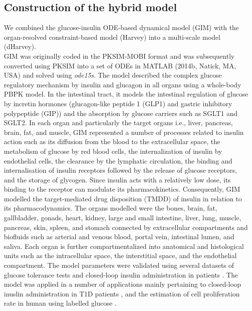 \subsection{Construction of the hybrid model} \label{GIM:sp1}
We combined the glucose-insulin ODE-based dynamical model (GIM) \cite{schaller2013generic} with the organ-resolved constraint-based model (Harvey) \cite{thiele2018metabolism} into a multi-scale model (dHarvey).\\
GIM was originally coded in the PKSIM-MOBI \cite{eissing2011computational} format and was subsequently converted using PKSIM into a set of ODEs in MATLAB (2014b, Natick, MA, USA) and solved using \textit{ode15s}. The model described the complex glucose regulatory mechanism by insulin and glucagon in all organs using a whole-body PBPK model. In the intestinal tract, it models the intestinal regulation of glucose by incretin hormones (glucagon-like peptide 1 (GLP1) and gastric inhibitory polypeptide (GIP)) and the absorption by glucose carriers such as SGLT1 and SGLT2. In each organ and particularly the target organs i.e., liver, pancreas, brain, fat, and muscle, GIM represented a number of processes related to insulin action such as its diffusion from the blood to the extracellular space, the metabolism of glucose by red blood cells, the internalization of insulin by endothelial cells, the clearance by the lymphatic circulation, the binding and internalisation of insulin receptors followed by the release of glucose receptors, and the storage of glycogen. Since insulin acts with a relatively low dose, its binding to the receptor can modulate its pharmacokinetics. Consequently, GIM modelled the target-mediated drug disposition (TMDD) of insulin in relation to its pharmacodynamics. The organs modelled were the bones, brain, fat, gallbladder, gonads, heart, kidney, large and small intestine, liver, lung, muscle, pancreas, skin, spleen, and stomach connected by extracellular compartments and biofluids such as arterial and venous blood, portal vein, intestinal lumen, and saliva. Each organ is further compartmentalized into anatomical and histological units such as the intracellular space, the interstitial space, and the endothelial compartment. The model parameters were validated using several datasets of glucose tolerance tests and closed-loop insulin administration in patients \cite{regittnig1999plasma,sorensen1985physiologic,el2010bihormonal}. The model was applied in a number of applications mainly pertaining to closed-loop inuslin administration in T1D patients \cite{wadehn2016multiscale,schaller2012new,schaller2016robust}, and the estimation of cell proliferation rate in human using labelled glucose \cite{lahoz2017physiologically}.\\
